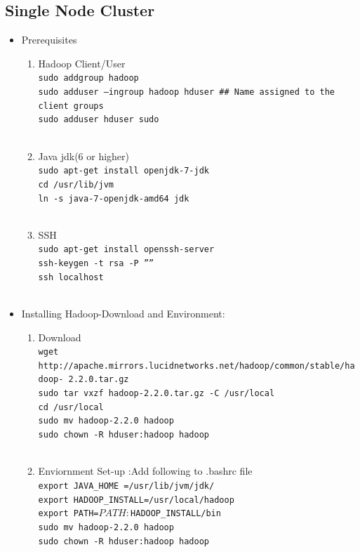 \documentclass[12pt]{book}
\newcommand{\shellcmd}[1]{\\\indent\texttt{\footnotesize #1}\\}
\begin{document}
\subsection{Single Node Cluster}
\begin{itemize}
 \item Prerequisites
\begin{enumerate}
 \item Hadoop Client/User
       \shellcmd{sudo addgroup hadoop  \\\indent 
                sudo adduser –ingroup hadoop hduser \#\# Name assigned to the client groups\\\indent 
                sudo adduser hduser sudo\\\indent
                }
 \item Java jdk(6 or higher)
       \shellcmd{sudo apt-get install openjdk-7-jdk  \\\indent 
                 cd /usr/lib/jvm \\\indent 
                 ln -s java-7-openjdk-amd64 jdk\\\indent
                 }
  \item SSH
        \shellcmd{sudo apt-get install openssh-server  \\\indent 
                  ssh-keygen -t rsa -P ”” \\\indent 
                  ssh localhost\\\indent 
                 }
\end{enumerate}
\item Installing Hadoop-Download and Environment:
\begin{enumerate}
 \item Download 
       \shellcmd{wget http://apache.mirrors.lucidnetworks.net/hadoop/common/stable/hadoop-
2.2.0.tar.gz \\\indent 
                sudo tar vxzf hadoop-2.2.0.tar.gz -C /usr/local \\\indent 
                cd /usr/local\\\indent 
               sudo mv hadoop-2.2.0 hadoop\\\indent 
                sudo chown -R hduser:hadoop hadoop\\\indent}

 \item Enviornment Set-up :Add following to .bashrc file
        \shellcmd{export JAVA\_HOME =/usr/lib/jvm/jdk/ \\\indent 
                  export HADOOP\_INSTALL=/usr/local/hadoop  \\\indent 
                  export PATH=$PATH:$HADOOP\_INSTALL/bin\\\indent 
                  sudo mv hadoop-2.2.0 hadoop\\\indent 
                  sudo chown -R hduser:hadoop hadoop\\\indent}
  

\end{enumerate}
\end{itemize}
\end{document}
